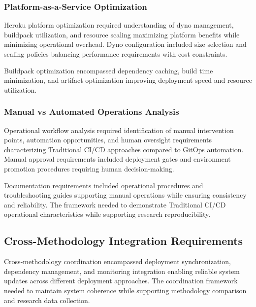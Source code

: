 \subsubsection{Platform-as-a-Service Optimization}
Heroku platform optimization required understanding of dyno management, buildpack utilization, and resource scaling maximizing platform benefits while minimizing operational overhead. Dyno configuration included size selection and scaling policies balancing performance requirements with cost constraints.

Buildpack optimization \cite{heroku_buildpacks2023} encompassed dependency caching, build time minimization, and artifact optimization improving deployment speed and resource utilization.

\subsubsection{Manual vs Automated Operations Analysis}
Operational workflow analysis required identification of manual intervention points, automation opportunities, and human oversight requirements characterizing Traditional CI/CD approaches compared to GitOps automation. Manual approval requirements included deployment gates and environment promotion procedures requiring human decision-making.


Documentation requirements included operational procedures and troubleshooting guides supporting manual operations while ensuring consistency and reliability. The framework needed to demonstrate Traditional CI/CD operational characteristics while supporting research reproducibility.



\subsection{Cross-Methodology Integration Requirements}

Cross-methodology coordination encompassed deployment synchronization, dependency management, and monitoring integration enabling reliable system updates across different deployment approaches. The coordination framework needed to maintain system coherence while supporting methodology comparison and research data collection.

